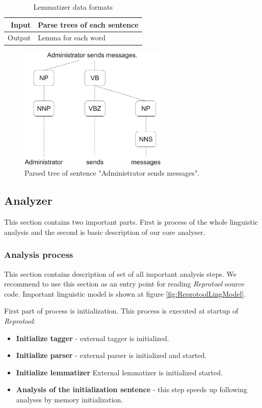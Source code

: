 \begin{table}[ht]   %
\begin{center}
  \begin{tabular}{| r | l |}
\hline
Input 	& Parse trees of each sentence \\ \hline
Output 	& Lemma for each word \\ 
\hline
  \end{tabular}
  \caption{Lemmatizer data formats}
  \label{tab.lemmatizer}
\end{center}
\end{table} 


\begin{figure}[ht]
  \centering
  \includegraphics[width=200pt]{images/ParsedTree}
  \caption{Parsed tree of sentence "Administrator sends messages".}
  \label{fig:ParsedTree}
\end{figure}

\subsection{Analyzer}
\label{sec:analyzer}
This section contains two important parts. First is process of the whole linguistic analysis and the second is basic description of our core analyser.

\subsubsection{Analysis process}
This section contains description of set of all important analysis steps. We recommend to use this section as an entry point for reading \emph{Reprotool} source code.
Important linguistic model is shown at figure \ref{fig:ReprotoolLingModel}. 

First part of process is initialization. This process is executed at startup of \emph{Reprotool}:

\begin{itemize}
\item {\bf Initialize tagger} - external tagger is initialized.
\item {\bf Initialize parser} - external parser is initialized and started.
\item {\bf Initialize lemmatizer} External lemmatizer is initialized started.
\item {\bf Analysis of the initialization sentence} - this step speeds up following analyses by memory initialization.
\end{itemize}

